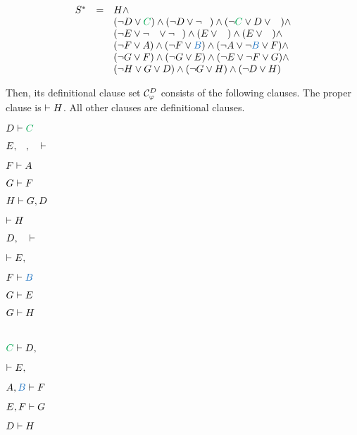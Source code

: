 \documentclass{llncs}
\begin{document}
\begin{example}
$$
\begin{array}{rcl}
S^*	
& \defEq & H \structplus \\
&			& 
(\structdual D \structtimes \hE{C})
\structplus
(\structdual D \structtimes \structdual \hF{C})
\structplus
( \structdual \hE{C} \structtimes D \structtimes \hF{C}) \structplus \\
&			&
(\structdual E \structtimes \structdual \hC{B} \structtimes \structdual \hD{A} )
\structplus
(E \structtimes \hC{B})
\structplus
(E \structtimes \hD{A}) \structplus \\
&			&
(\structdual F \structtimes \hA{A})
\structplus
(\structdual F \structtimes \hB{B})
\structplus
(\structdual \hA{A} \structtimes \structdual \hB{B} \structtimes F) \structplus \\
&			&
(\structdual G \structtimes F)
\structplus
(\structdual G \structtimes E)
\structplus
(\structdual E \structtimes \structdual F \structtimes G) \structplus \\
&			&
(\structdual H \structtimes G \structtimes D)
\structplus
(\structdual G \structtimes H)
\structplus
(\structdual D \structtimes H) \\
\end{array}
$$

Then, its definitional clause set $\mathcal{C}^{D}_{\varphi}$ consists of the following clauses. The proper clause is $\vdash H$. All other clauses are definitional clauses.

\begin{multicols}{3}{
{
$D \seq \hE{C}$

$E, \hC{B}, \hD{A} \seq $

$F \vdash A$

$G \vdash F$

$H \vdash G, D$

$\vdash H$
}

{
$D, \hF{C} \seq $

$\seq E, \hC{B}$

$F \seq \hB{B}$

$G \vdash E$

$G \vdash H$

$\phantom{\seq H}$
}

{
$ \hE{C} \seq D, \hF{C}$

$\seq E, \hD{A}$

$\hA{A}, \hB{B} \seq F$

$E, F \vdash G$

$D \vdash H$

$\phantom{\seq H}$
}
}\end{multicols}

\end{example}
\end{document}
